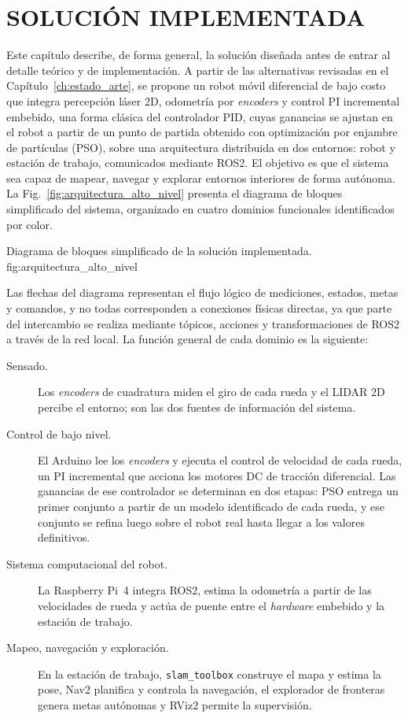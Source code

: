\chapter{SOLUCIÓN IMPLEMENTADA}
\label{ch:solucion}

Este capítulo describe, de forma general, la solución diseñada antes de entrar
al detalle teórico y de implementación. A partir de las alternativas revisadas
en el Capítulo~\ref{ch:estado_arte}, se propone un robot móvil diferencial de
bajo costo que integra percepción láser 2D, odometría por \textit{encoders} y control
PI incremental embebido, una forma clásica del controlador PID, cuyas
ganancias se ajustan en el robot a partir de un punto de partida obtenido
con optimización por enjambre de partículas (PSO), sobre
una arquitectura distribuida en dos entornos: robot y
estación de trabajo, comunicados mediante \gls{ROS2}. El objetivo es que el
sistema sea capaz de mapear, navegar y explorar entornos interiores de forma
autónoma.
La Fig.~\ref{fig:arquitectura_alto_nivel} presenta el diagrama de bloques
simplificado del sistema, organizado en cuatro dominios funcionales
identificados por color.

{Diagrama de bloques simplificado de la solución implementada.}
{fig:arquitectura_alto_nivel}

Las flechas del diagrama representan el flujo lógico de mediciones, estados,
metas y comandos, y no todas corresponden a conexiones físicas directas, ya que
parte del intercambio se realiza mediante tópicos, acciones y transformaciones
de \gls{ROS2} a través de la red local.
La función general de cada dominio es la siguiente:

\begin{description}
\item[Sensado.] Los \textit{encoders} de cuadratura miden el giro de cada rueda
y el \gls{LIDAR} 2D percibe el entorno; son las dos fuentes de información del
sistema.
\item[Control de bajo nivel.] El \gls{Arduino} lee los \textit{encoders} y ejecuta el
control de velocidad de cada rueda, un PI incremental que acciona los motores
DC de tracción diferencial. Las ganancias de ese controlador se determinan en
dos etapas: PSO
entrega un primer conjunto a partir de un modelo identificado de cada rueda, y
ese conjunto se refina luego sobre el robot real hasta llegar a los valores
definitivos.
\item[Sistema computacional del robot.] La Raspberry Pi~4 integra \gls{ROS2},
estima la odometría a partir de las velocidades de rueda y actúa de puente
entre el \textit{hardware} embebido y la estación de trabajo.
\item[Mapeo, navegación y exploración.] En la estación de trabajo,
\texttt{slam\_toolbox} construye el mapa y estima la pose, Nav2 planifica y
controla la navegación, el explorador de fronteras genera metas autónomas y
RViz2 permite la supervisión.
\end{description}

